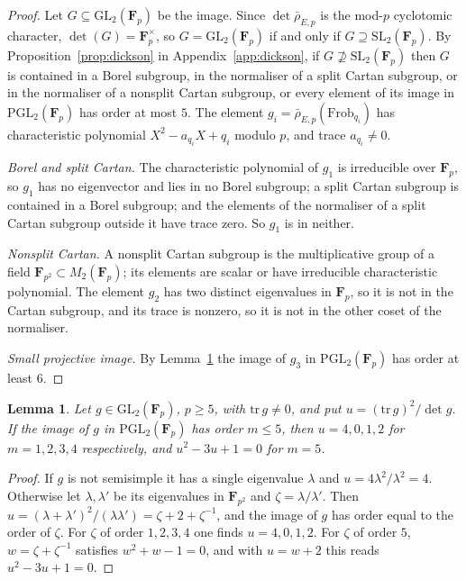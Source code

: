 \documentclass[11pt]{amsart}
\newtheorem{lemma}[theorem]{Lemma}
\theoremstyle{definition}
\newcommand{\F}{\mathbf{F}}
\newcommand{\GL}{\mathrm{GL}}
\newcommand{\SL}{\mathrm{SL}}
\newcommand{\PGL}{\mathrm{PGL}}
\newcommand{\rhobar}{\bar\rho_{E,p}}
\begin{document}
\begin{proof}
Let $G\subseteq\GL_2(\F_p)$ be the image. Since $\det\rhobar$ is the mod-$p$ cyclotomic character, $\det(G)=\F_p^\times$, so $G=\GL_2(\F_p)$ if and only if $G\supseteq\SL_2(\F_p)$. By Proposition~\ref{prop:dickson} in Appendix~\ref{app:dickson}, if $G\not\supseteq\SL_2(\F_p)$ then $G$ is contained in a Borel subgroup, in the normaliser of a split Cartan subgroup, or in the normaliser of a nonsplit Cartan subgroup, or every element of its image in $\PGL_2(\F_p)$ has order at most $5$. The element $g_i=\rhobar(\mathrm{Frob}_{q_i})$ has characteristic polynomial $X^2-a_{q_i}X+q_i$ modulo $p$, and trace $a_{q_i}\neq0$.

\emph{Borel and split Cartan.} The characteristic polynomial of $g_1$ is irreducible over $\F_p$, so $g_1$ has no eigenvector and lies in no Borel subgroup; a split Cartan subgroup is contained in a Borel subgroup; and the elements of the normaliser of a split Cartan subgroup outside it have trace zero. So $g_1$ is in neither.

\emph{Nonsplit Cartan.} A nonsplit Cartan subgroup is the multiplicative group of a field $\F_{p^2}\subset M_2(\F_p)$; its elements are scalar or have irreducible characteristic polynomial. The element $g_2$ has two distinct eigenvalues in $\F_p$, so it is not in the Cartan subgroup, and its trace is nonzero, so it is not in the other coset of the normaliser.

\emph{Small projective image.} By Lemma~\ref{lem:projorder} the image of $g_3$ in $\PGL_2(\F_p)$ has order at least $6$.
\end{proof}

\begin{lemma}\label{lem:projorder}
Let $g\in\GL_2(\F_p)$, $p\ge5$, with $\mathrm{tr}\,g\neq0$, and put $u=(\mathrm{tr}\,g)^2/\det g$. If the image of $g$ in $\PGL_2(\F_p)$ has order $m\le5$, then $u=4,0,1,2$ for $m=1,2,3,4$ respectively, and $u^2-3u+1=0$ for $m=5$.
\end{lemma}

\begin{proof}
If $g$ is not semisimple it has a single eigenvalue $\lambda$ and $u=4\lambda^2/\lambda^2=4$. Otherwise let $\lambda,\lambda'$ be its eigenvalues in $\F_{p^2}$ and $\zeta=\lambda/\lambda'$. Then $u=(\lambda+\lambda')^2/(\lambda\lambda')=\zeta+2+\zeta^{-1}$, and the image of $g$ has order equal to the order of $\zeta$. For $\zeta$ of order $1,2,3,4$ one finds $u=4,0,1,2$. For $\zeta$ of order $5$, $w=\zeta+\zeta^{-1}$ satisfies $w^2+w-1=0$, and with $u=w+2$ this reads $u^2-3u+1=0$.
\end{proof}
\end{document}

